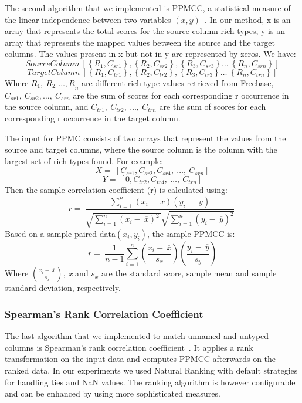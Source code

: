 \documentclass{../../Util/LaTEX/sig-alternate}
\begin{document}
The second algorithm that we implemented is PPMCC, a statistical measure of the linear independence between two variables $\left(x,y\right)$~\cite{citeulike:8051946}. In our method, x is an array that represents the total scores for the source column rich types, y is an array that represents the mapped values between the source and the target columns. The values present in x but not in y are represented by zeros. We have:
\[SourceColumn\ \left[\left\{R_1,C_{sr1}\right\},\left\{R_2,C_{sr2}\right\},\left\{R_3,C_{sr3}\right\}\dots \ \left\{R_n,C_{srn}\right\}\right]\]
\[TargetColumn\ \left[\left\{R_1,C_{tr1}\right\},\left\{R_2,C_{tr2}\right\},\left\{R_3,C_{tr3}\right\}\dots \ \left\{R_n,C_{trn}\right\}\right]\]
Where $R_1,\ R_{2,}{\dots ,R}_n$ are different rich type values retrieved from Freebase, $C_{sr1},\ C_{sr2},\dots ,\ C_{srn}$ are the sum of scores for each corresponding r occurrence in the source column, and $C_{tr1},\ C_{tr2},\ \dots ,\ C_{trn}$ are the sum of scores for each corresponding r occurrence in the target column.

The input for PPMC consists of two arrays that represent the values from the source and target columns, where the source column is the column with the largest set of rich types found. For example:
\[X=\ \left[C_{sr1},C_{sr2},C_{sr4},\ \dots ,\ C_{srn}\right]\]
\[Y=\ \left[0,C_{tr2},C_{tr4},\ \dots ,\ C_{trn}\right]\]
Then the sample correlation coefficient (r) is calculated using:
\[r=\ \frac{\sum^n_{i=1}{\left(x_i-\ \overline{x}\right)\left(y_{i\ }-\ \overline{y}\right)}}{\sqrt{\sum^n_{i=1}{{\left(x_i-\ \overline{x}\right)}^{2\ }}}\sqrt{\sum^n_{i=1}{{\left(y_i-\ \overline{y}\right)}^2}}}\ \]
Based on a sample paired data$\left(x_i,y_i\right)$, the sample PPMCC is:
\[r=\ \frac{1}{n-1}\sum^n_{i=1}{\left(\frac{x_i-\ \overline{x}}{s_x}\right)}\left(\frac{y_i-\ \overline{y}}{s_y}\right)\]
Where $\left(\frac{x_i-\ \overline{x}}{s_x}\right),\ \overline{x\ }$and $s_x$ are the standard score, sample mean and sample standard deviation, respectively.


\subsubsection{Spearman's Rank Correlation Coefficient}
The last algorithm that we implemented to match unnamed and untyped columns is Spearman's rank correlation coefficient~\cite{books/daglib/0020904}. It applies a rank transformation on the input data and computes PPMCC afterwards on the ranked data. In our experiments we used Natural Ranking with default strategies for handling ties and NaN values. The ranking algorithm is however configurable and can be enhanced by using more sophisticated measures.
\end{document}
